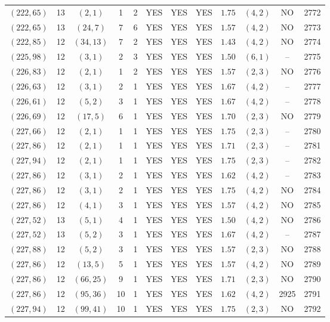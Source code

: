 \begin{longtable}{|c|c|c|c|c|c|c|c|c|c|c|c|}
$(222,65)$ & 13 & $(2,1)$ & 1 & 2 & YES & YES & YES & $1.75$ & $(4,2)$ & NO & 2772\\
$(222,65)$ & 13 & $(24,7)$ & 7 & 6 & YES & YES & YES & $1.57$ & $(4,2)$ & NO & 2773\\
$(222,85)$ & 12 & $(34,13)$ & 7 & 2 & YES & YES & YES & $1.43$ & $(4,2)$ & NO & 2774\\
$(225,98)$ & 12 & $(3,1)$ & 2 & 3 & YES & YES & YES & $1.50$ & $(6,1)$ & -- & 2775\\
$(226,83)$ & 12 & $(2,1)$ & 1 & 2 & YES & YES & YES & $1.57$ & $(2,3)$ & NO & 2776\\
$(226,63)$ & 12 & $(3,1)$ & 2 & 1 & YES & YES & YES & $1.67$ & $(4,2)$ & -- & 2777\\
$(226,61)$ & 12 & $(5,2)$ & 3 & 1 & YES & YES & YES & $1.67$ & $(4,2)$ & -- & 2778\\
$(226,69)$ & 12 & $(17,5)$ & 6 & 1 & YES & YES & YES & $1.70$ & $(2,3)$ & NO & 2779\\
$(227,66)$ & 12 & $(2,1)$ & 1 & 1 & YES & YES & YES & $1.75$ & $(2,3)$ & -- & 2780\\
$(227,86)$ & 12 & $(2,1)$ & 1 & 1 & YES & YES & YES & $1.71$ & $(2,3)$ & -- & 2781\\
$(227,94)$ & 12 & $(2,1)$ & 1 & 1 & YES & YES & YES & $1.75$ & $(2,3)$ & -- & 2782\\
$(227,86)$ & 12 & $(3,1)$ & 2 & 1 & YES & YES & YES & $1.62$ & $(4,2)$ & -- & 2783\\
$(227,86)$ & 12 & $(3,1)$ & 2 & 1 & YES & YES & YES & $1.75$ & $(4,2)$ & NO & 2784\\
$(227,86)$ & 12 & $(4,1)$ & 3 & 1 & YES & YES & YES & $1.57$ & $(4,2)$ & NO & 2785\\
$(227,52)$ & 13 & $(5,1)$ & 4 & 1 & YES & YES & YES & $1.50$ & $(4,2)$ & NO & 2786\\
$(227,52)$ & 13 & $(5,2)$ & 3 & 1 & YES & YES & YES & $1.67$ & $(4,2)$ & -- & 2787\\
$(227,88)$ & 12 & $(5,2)$ & 3 & 1 & YES & YES & YES & $1.57$ & $(2,3)$ & NO & 2788\\
$(227,86)$ & 12 & $(13,5)$ & 5 & 1 & YES & YES & YES & $1.57$ & $(4,2)$ & NO & 2789\\
$(227,86)$ & 12 & $(66,25)$ & 9 & 1 & YES & YES & YES & $1.71$ & $(2,3)$ & NO & 2790\\
$(227,86)$ & 12 & $(95,36)$ & 10 & 1 & YES & YES & YES & $1.62$ & $(4,2)$ & 2925 & 2791\\
$(227,94)$ & 12 & $(99,41)$ & 10 & 1 & YES & YES & YES & $1.75$ & $(2,3)$ & NO & 2792\\

\end{longtable}
